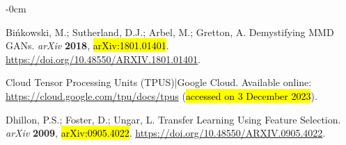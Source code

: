 \documentclass[technologies,article,accept,pdftex,moreauthors]{Definitions/mdpi}
\begin{document}
\begin{adjustwidth}{-\extralength}{0cm}
\begin{thebibliography}{999}

Bińkowski, M.; Sutherland, D.J.; Arbel, M.; Gretton, A.
\newblock Demystifying MMD GANs.  \emph{arXiv} \textbf{2018},  \hl{arXiv:1801.01401}.   {\url{https://doi.org/10.48550/ARXIV.1801.01401}}.

Cloud Tensor Processing Units (TPUS)|Google Cloud. Available online: \url{https://cloud.google.com/tpu/docs/tpus} (\hl{accessed on 3 December 2023}). 

Dhillon, P.S.; Foster, D.; Ungar, L.  Transfer Learning Using Feature Selection.  \emph{arXiv} \textbf{2009},  \hl{arXiv:0905.4022}. {\url{https://doi.org/10.48550/ARXIV.0905.4022}}.

\end{thebibliography}

\PublishersNote{}
\end{adjustwidth}
\end{document}
